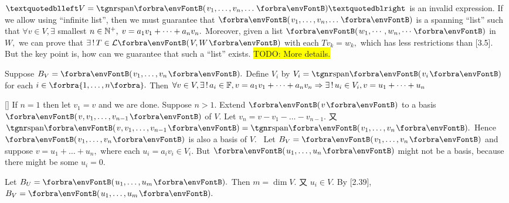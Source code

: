 \BulletPointX{}\;\;$“V=\Span{v_1,\dots,v_n,\dots}”$ is an invalid expression.\TextB{}
If we allow using $“$infinite list$”$, then we must guarantee that $\Par{v_1,\dots,v_n,\dots}$ is a spanning $“$list$”$\TextB{}
such that $\forall v\in V,\exists$ smallest $n\in{\mathbb{N}^+},\;v=a_1 v_1+\dots+a_n v_n.$ Moreover, given a list $\Par{w_1,\cdots,w_n,\cdots}$ in $W,$\TextB{}
we can prove that $\exists\,!\,T\in\Lm{V,W}$ with each $Tv_k=w_k,$ which has less restrictions than [3.5].\TextB{}
But the key point is, how can we guarantee that such a $“$list$”$ exists. \colorbox{yellow}{TODO: More details.}
\SepLine\ChEnd

\vfill{}

\vspace{8pt}

Suppose $B_V=\Par{v_1,\dots,v_n}.$ Define $V_i$ by $V_i=\Span{v_i}$ for each $i\in\Bra{1,\dots,n}.$\parSol{}
Then $\forall v\in V,\exists\,!\,a_i\in{\mathbb{F}},v=a_1 v_1+\dots+a_n v_n\Rightarrow\exists\,!\,u_i\in V_i,v=u_1+\dots+u_n$\PfEnd
\SepLine

[]{
	\TextB{}
}If $n=1$ then let $v_1=v$ and we are done. Suppose $n>1.$\parSol{}
Extend $\Par{v}$ to a basis $\Par{v,v_1,\dots,v_{n-1}}$ of $V.$ Let $v_n=v-v_1-\dots-v_{n-1}.$\parSol{}
又 $\Span{v,v_1,\dots,v_{n-1}}=\Span{v_1,\dots,v_n}.$ Hence $\Par{v_1,\dots,v_n}$ is also a basis of $V.$\PfEnd\vspace{4pt}
\Comment \,\,\,Let $B_V=\Par{v_1,\dots,v_n}$ and suppose $v=u_1+\dots+u_n,$ where each $u_i=a_i v_i\in V_i.$\parCom
But $\Par{u_1,\dots,u_n}$ might not be a basis, because there might be some $u_i=0.$\vspace{-2pt}
\SepLine\pagebreak

\Blind{\IndentN} Let $B_U=\Par{u_1,\dots,u_m}.$ Then $m=\dim V.$ 又 $u_i\in V.$ By [2.39], $B_V=\Par{u_1,\dots,u_m}.$\PfEnd\vspace{-2pt}
\SepLine[-2pt]


